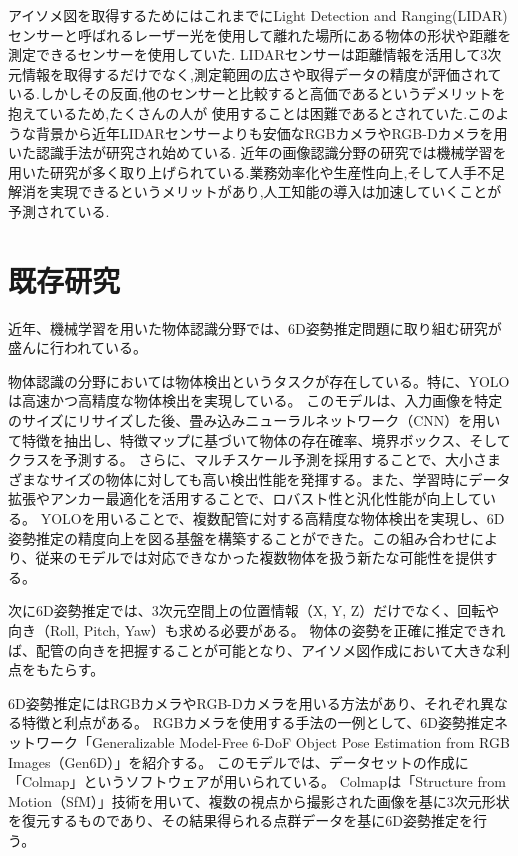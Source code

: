 アイソメ図を取得するためにはこれまでにLight Detection and Ranging(LIDAR)センサーと呼ばれるレーザー光を使用して離れた場所にある物体の形状や距離を測定できるセンサーを使用していた.
LIDARセンサーは距離情報を活用して3次元情報を取得するだけでなく,測定範囲の広さや取得データの精度が評価されている.しかしその反面,他のセンサーと比較すると高価であるというデメリットを抱えているため,たくさんの人が
使用することは困難であるとされていた.このような背景から近年LIDARセンサーよりも安価なRGBカメラやRGB-Dカメラを用いた認識手法が研究され始めている.
近年の画像認識分野の研究では機械学習を用いた研究が多く取り上げられている.業務効率化や生産性向上,そして人手不足解消を実現できるというメリットがあり,人工知能の導入は加速していくことが予測されている.


\section{既存研究}
近年、機械学習を用いた物体認識分野では、6D姿勢推定問題に取り組む研究が盛んに行われている。

物体認識の分野においては物体検出というタスクが存在している。特に、YOLOは高速かつ高精度な物体検出を実現している。
このモデルは、入力画像を特定のサイズにリサイズした後、畳み込みニューラルネットワーク（CNN）を用いて特徴を抽出し、特徴マップに基づいて物体の存在確率、境界ボックス、そしてクラスを予測する。
さらに、マルチスケール予測を採用することで、大小さまざまなサイズの物体に対しても高い検出性能を発揮する。また、学習時にデータ拡張やアンカー最適化を活用することで、ロバスト性と汎化性能が向上している。
YOLOを用いることで、複数配管に対する高精度な物体検出を実現し、6D姿勢推定の精度向上を図る基盤を構築することができた。この組み合わせにより、従来のモデルでは対応できなかった複数物体を扱う新たな可能性を提供する。

次に6D姿勢推定では、3次元空間上の位置情報（X, Y, Z）だけでなく、回転や向き（Roll, Pitch, Yaw）も求める必要がある。
物体の姿勢を正確に推定できれば、配管の向きを把握することが可能となり、アイソメ図作成において大きな利点をもたらす。

6D姿勢推定にはRGBカメラやRGB-Dカメラを用いる方法があり、それぞれ異なる特徴と利点がある。
RGBカメラを使用する手法の一例として、6D姿勢推定ネットワーク「Generalizable Model-Free 6-DoF Object Pose Estimation from RGB Images（Gen6D）」を紹介する。
このモデルでは、データセットの作成に「Colmap」というソフトウェアが用いられている。
Colmapは「Structure from Motion（SfM）」技術を用いて、複数の視点から撮影された画像を基に3次元形状を復元するものであり、その結果得られる点群データを基に6D姿勢推定を行う。

